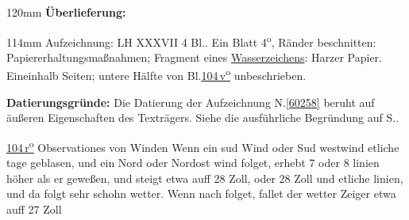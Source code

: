 %
\frenchspacing%
\begin{ledgroupsized}[r]{120mm}%
\footnotesize%
\pstart%
\noindent%
\textbf{Überlieferung:}%
\pend%
\end{ledgroupsized}%
\begin{ledgroupsized}[r]{114mm}%
\footnotesize%
\pstart%
\parindent -6mm%
%
Aufzeichnung:
LH XXXVII 4 Bl..
Ein Blatt 4\textsuperscript{o},
Ränder beschnitten:
Papiererhaltungsmaßnahmen;
Fragment eines
\href{\Scan{LH_37_04_104wz}}{Wasserzeichens}:
Harzer Papier. %
Eineinhalb Seiten;
untere Hälfte von Bl.\;\href{\Scan{LH_37_04_104v}}{104\,v\textsuperscript{o}} unbeschrieben.
\pend%
\end{ledgroupsized}%
\vspace{5mm}%
\begin{ledgroup}%
\footnotesize%
\pstart%
\noindent%
\textbf{Datierungsgründe:}
Die Datierung der Aufzeichnung N.\;\ref{60258} beruht auf äußeren Eigenschaften des Texträgers.
Siehe die ausführliche Begründung auf S.\;\pageref{60258_dat}.%
\pend%
\end{ledgroup}%
%
\frenchspacing%
\vspace*{8mm}
\normalsize%
\pstart%
\noindent%
\lbrack%
\href{\Scan{LH_37_04_104r}}%
{104\,r\textsuperscript{o}}%
\rbrack%
\hfill%
Observationes von Winden%
%
%
\hfill%
%
\pend%
\pstart%
\noindent%
Wenn ein sud Wind%
oder Sud westwind%
etliche tage geblasen,%
und ein Nord%
oder Nordost wind%
folget,
erhebt
7 oder 8 linien höher
als er geweßen,
und steigt etwa auff 28 Zoll,%
oder 28 Zoll und etliche linien,
und da folgt sehr schohn wetter.%
%
\pend%
\pstart%
Wenn nach
folget,
fallet der wetter Zeiger%
%
etwa auff 27 Zoll%
